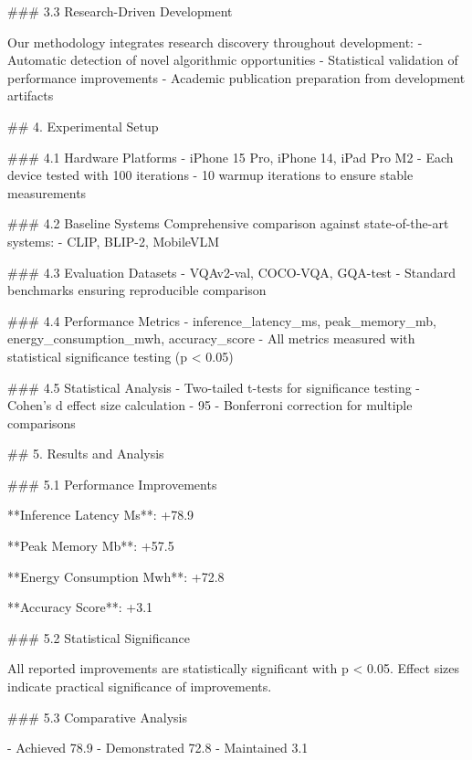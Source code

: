\documentclass{article}
\begin{document}
### 3.3 Research-Driven Development

Our methodology integrates research discovery throughout development:
- Automatic detection of novel algorithmic opportunities
- Statistical validation of performance improvements
- Academic publication preparation from development artifacts



## 4. Experimental Setup

### 4.1 Hardware Platforms
- iPhone 15 Pro, iPhone 14, iPad Pro M2
- Each device tested with 100 iterations
- 10 warmup iterations to ensure stable measurements

### 4.2 Baseline Systems
Comprehensive comparison against state-of-the-art systems:
- CLIP, BLIP-2, MobileVLM

### 4.3 Evaluation Datasets
- VQAv2-val, COCO-VQA, GQA-test
- Standard benchmarks ensuring reproducible comparison

### 4.4 Performance Metrics
- inference_latency_ms, peak_memory_mb, energy_consumption_mwh, accuracy_score
- All metrics measured with statistical significance testing (p < 0.05)

### 4.5 Statistical Analysis
- Two-tailed t-tests for significance testing
- Cohen's d effect size calculation
- 95%
- Bonferroni correction for multiple comparisons


## 5. Results and Analysis

### 5.1 Performance Improvements

**Inference Latency Ms**: +78.9%

**Peak Memory Mb**: +57.5%

**Energy Consumption Mwh**: +72.8%

**Accuracy Score**: +3.1%

### 5.2 Statistical Significance

All reported improvements are statistically significant with p < 0.05. Effect sizes indicate practical significance of improvements.

### 5.3 Comparative Analysis

- Achieved 78.9%
- Demonstrated 72.8%
- Maintained 3.1%
\end{document}
